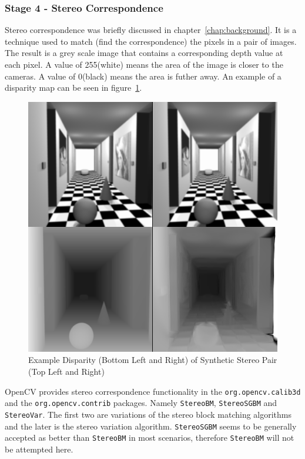 \documentclass[11pt,oneside]{report}
\newcommand\code[1]{\texttt{#1}}
\begin{document}
		\subsubsection{Stage 4 - Stereo Correspondence}
		Stereo correspondence was briefly discussed in chapter~\ref{chap:background}.
		It is a technique used to match (find the correspondence) the pixels in a pair of images.
		The result is a grey scale image that contains a corresponding depth value at each pixel.
		A value of 255(white) means the area of the image is closer to the cameras. A value of 0(black) means the area is futher away.
		An example of a disparity map can be seen in figure~\ref{fig:dispExample}.
		\begin{figure}
			\centering
    				\includegraphics[width=\textwidth]{dispExample}
    				\caption{Example Disparity (Bottom Left and Right) of Synthetic Stereo Pair (Top Left and Right)  \protect\cite{image:stereoPair} {\label{fig:dispExample}}}
		\end{figure}	
		
		OpenCV provides stereo correspondence functionality in the \code{org.opencv.calib3d} and the \code{org.opencv.contrib} packages.
		Namely \code{StereoBM}, \code{StereoSGBM} and \code{StereoVar}.
		The first two are variations of the stereo block matching algorithms and the later is the stereo variation algorithm.
		\code{StereoSGBM} seems to be generally accepted as better than \code{StereoBM} in most scenarios, therefore \code{StereoBM} will not be attempted here.
		
\end{document}
